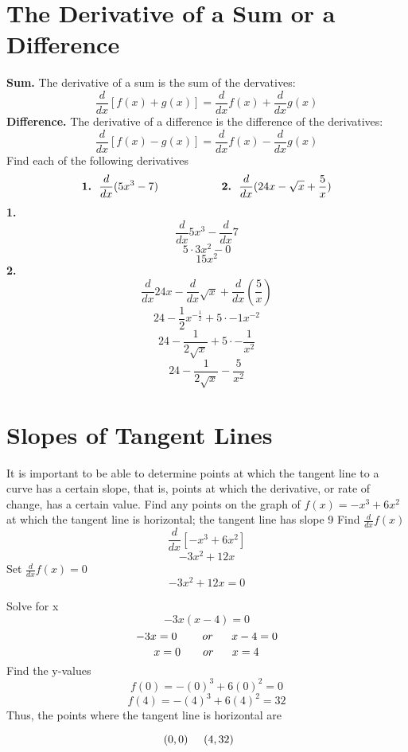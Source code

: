 \documentclass{report}
\begin{document}
\section*{The Derivative of a Sum or a Difference}
\bigbreak \noindent
\textbf{Sum.} \hspace{15mm} The derivative of a sum is the sum of the dervatives:
$$ \frac{d}{dx}\left[f(x) + g(x)\right] = \frac{d}{dx}f(x) + \frac{d}{dx}g(x)$$
\bigbreak \noindent
\textbf{Difference.} \hspace{6mm} The derivative of a difference is the difference of the derivatives:
$$ \frac{d}{dx}\left[f(x) - g(x) \right] = \frac{d}{dx}f(x) - \frac{d}{dx}g(x)$$
\bigbreak \noindent \bigbreak \noindent
Find each of the following derivatives
\bigbreak \noindent
$$ \textbf{1.} \ \  \frac{d}{dx}(5x^3 -7) \hspace{20mm} \textbf{2.} \ \ \frac{d}{dx}(24x -\sqrt{x} + \frac{5}{x})$$
\bigbreak \noindent
\textbf{1.}
$$ \frac{d}{dx}5x^3 - \frac{d}{dx}7$$
$$ 5 \cdot 3x^2 - 0$$
$$ 15x^2$$
\bigbreak \noindent
\textbf{2.}
$$ \frac{d}{dx}24x - \frac{d}{dx}\sqrt{x} + \frac{d}{dx}\left(\frac{5}{x}\right)$$
$$ 24 - \frac{1}{2}x^{-\frac{1}{2}} + 5 \cdot -1x^{-2}$$
$$ 24 - \frac{1}{2\sqrt{x}} + 5 \cdot -\frac{1}{x^2}$$
$$ 24 - \frac{1}{2\sqrt{x}} - \frac{5}{x^2}$$
\bigbreak \bigbreak \noindent
\section*{Slopes of Tangent Lines}
It is important to be able to determine points at which the tangent line to a curve has a certain slope, that is, points at which the derivative, or rate of change, has a certain value.
\bigbreak \noindent \bigbreak \noindent
\q{}
 Find any points on the graph of $f(x) = -x^3 + 6x^2$ at which the tangent line is horizontal; the tangent line has slope 9
 \bigbreak \noindent \bigbreak \noindent
 Find $\frac{d}{dx}f(x)$
 $$ \frac{d}{dx}\left[-x^3 + 6x^2\right]$$
 $$ -3x^2 + 12x$$
 \bigbreak \noindent
 Set $ \frac{d}{dx}f(x) = 0$
 $$ -3x^2 +12x = 0$$

 \pagebreak
 \noindent Solve for x
 $$ -3x(x-4) = 0$$
 $$ -3x = 0 \hspace{8mm}or \ \  \  \ \ x -4 = 0$$
 $$ x = 0 \hspace{7mm} or \ \ \ \ \ x = 4$$
 \bigbreak \noindent
 Find the y-values
$$ f(0) = -(0)^3 + 6(0)^2 = 0$$
$$ f(4) = -(4)^3 + 6(4)^2 = 32$$
\bigbreak \noindent \bigbreak \noindent
Thus, the points where the tangent line is horizontal are

$$ \vspace{-3mm}\hspace{-5mm}(0,0) \hspace{5mm} (4,32)$$
\begin{figure}[ht]
    \centering
\end{figure}
\bigbreak \noindent
\end{document}
